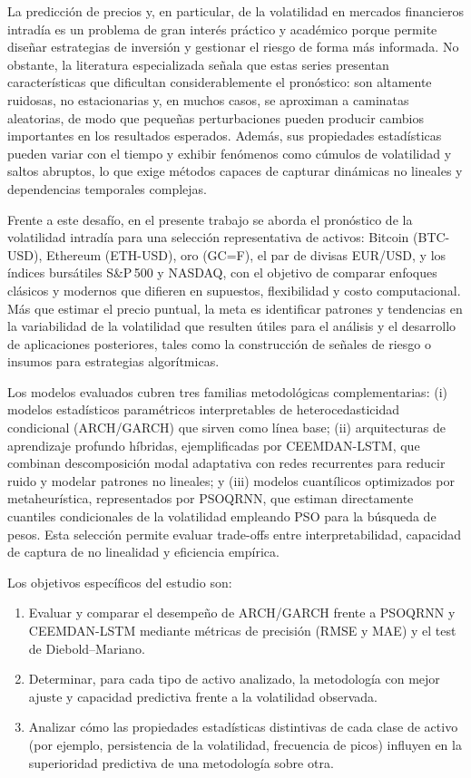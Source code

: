 \documentclass[12pt]{paper}
\begin{document}
La predicción de precios y, en particular, de la volatilidad en mercados financieros intradía es un problema de gran interés práctico y académico porque permite diseñar estrategias de inversión y gestionar el riesgo de forma más informada. No obstante, la literatura especializada señala que estas series presentan características que dificultan considerablemente el pronóstico: son altamente ruidosas, no estacionarias y, en muchos casos, se aproximan a caminatas aleatorias, de modo que pequeñas perturbaciones pueden producir cambios importantes en los resultados esperados. Además, sus propiedades estadísticas pueden variar con el tiempo y exhibir fenómenos como cúmulos de volatilidad y saltos abruptos, lo que exige métodos capaces de capturar dinámicas no lineales y dependencias temporales complejas.

Frente a este desafío, en el presente trabajo se aborda el pronóstico de la volatilidad intradía para una selección representativa de activos: Bitcoin (BTC-USD), Ethereum (ETH-USD), oro (GC=F), el par de divisas EUR/USD, y los índices bursátiles S\&P\,500 y NASDAQ, con el objetivo de comparar enfoques clásicos y modernos que difieren en supuestos, flexibilidad y costo computacional. Más que estimar el precio puntual, la meta es identificar patrones y tendencias en la variabilidad de la volatilidad que resulten útiles para el análisis y el desarrollo de aplicaciones posteriores, tales como la construcción de señales de riesgo o insumos para estrategias algorítmicas.

Los modelos evaluados cubren tres familias metodológicas complementarias: (i) modelos estadísticos paramétricos interpretables de heterocedasticidad condicional (ARCH/GARCH) que sirven como línea base; (ii) arquitecturas de aprendizaje profundo híbridas, ejemplificadas por CEEMDAN-LSTM, que combinan descomposición modal adaptativa con redes recurrentes para reducir ruido y modelar patrones no lineales; y (iii) modelos cuantílicos optimizados por metaheurística, representados por PSOQRNN, que estiman directamente cuantiles condicionales de la volatilidad empleando PSO para la búsqueda de pesos. Esta selección permite evaluar trade-offs entre interpretabilidad, capacidad de captura de no linealidad y eficiencia empírica.

Los objetivos específicos del estudio son:
\begin{enumerate}
    \item Evaluar y comparar el desempeño de ARCH/GARCH frente a PSOQRNN y CEEMDAN-LSTM mediante métricas de precisión (RMSE y MAE) y el test de Diebold--Mariano.
    \item Determinar, para cada tipo de activo analizado, la metodología con mejor ajuste y capacidad predictiva frente a la volatilidad observada.
    \item Analizar cómo las propiedades estadísticas distintivas de cada clase de activo (por ejemplo, persistencia de la volatilidad, frecuencia de picos) influyen en la superioridad predictiva de una metodología sobre otra.
\end{enumerate}
\end{document}
